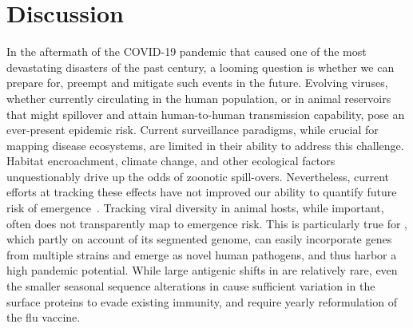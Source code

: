 \documentclass[onecolumn, compsoc,10pt]{IEEEtran}
\begin{document}
{\color{magenta}

  

{\color{Red1}
  \section*{Discussion}
  In the aftermath of the COVID-19 pandemic that caused one of the most devastating disasters of the past century, a looming question is whether we can prepare for, preempt and mitigate such events in the future. Evolving viruses, whether currently circulating in the human population, or in animal reservoirs that might spillover and attain human-to-human transmission capability, pose an ever-present epidemic risk.  Current surveillance paradigms, while crucial for mapping disease ecosystems, are limited in their ability to address this challenge. Habitat encroachment, climate change, and other ecological factors~\cite{rulli2017nexus,chua2002anthropogenic,childs2004zoonotic} unquestionably drive up the odds of zoonotic spill-overs. Nevertheless, current efforts at tracking these effects have not improved our ability to quantify future risk of emergence~\cite{fair2019viral}. Tracking viral diversity in animal hosts, while important, often does not transparently map to emergence risk.  This is particularly true for \infl, which partly on account of its segmented genome, can easily incorporate genes from multiple strains and emerge as novel human pathogens, and thus harbor a high pandemic potential. While large antigenic shifts in \infl are relatively rare, even the smaller seasonal sequence alterations in cause sufficient variation in the surface proteins to evade existing immunity, and require yearly reformulation of the flu vaccine.

}}
\end{document}
